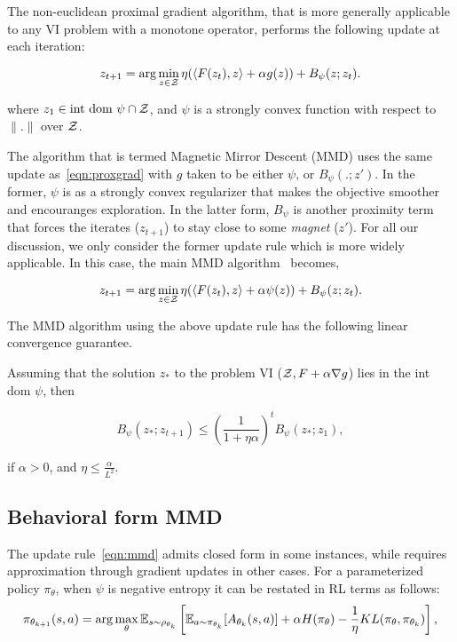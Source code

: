 The non-euclidean proximal gradient algorithm, that is more generally applicable to any VI problem
with a monotone operator, performs the following update at each iteration:

\begin{equation}
	\label{eqn:proxgrad} z_{t+1} = \arg \min_{z \in \mathcal{Z}} \eta (\langle F(z_t),
	z\rangle + \alpha g(z)) + B_{\psi} (z; z_t).
\end{equation}

where $z_1 \in \text{int dom } \psi \cap \mathcal{Z}$, and $\psi$ is a strongly convex function with respect to $\|.\|$ over $\mathcal{Z}$.

The algorithm that is termed Magnetic Mirror Descent (MMD) uses the same update
as~\ref{eqn:proxgrad} with $g$ taken to be either $\psi$, or $B_{\psi}(.
	;z')$.
In the former, $\psi$ is as a strongly convex regularizer that makes the objective smoother and
encouranges exploration.
In the latter form, $B_{\psi}$ is another proximity term that forces the iterates ($z_{t+1}$) to
stay close to some \textit{magnet} ($z'$).
For all our discussion, we only consider the former update rule which is more widely applicable.
In this case, the main MMD algorithm~\cite[(Algorithm 3.6)]{sokotaUnified2023} becomes,

\begin{equation}
	\label{eqn:mmd} z_{t+1} = \arg \min_{z \in \mathcal{Z}} \eta
	(\langle F(z_t), z\rangle + \alpha \psi(z)) + B_{\psi} (z; z_t).
\end{equation}

The MMD algorithm using the above update rule has the following linear convergence guarantee.
\begin{theorem}
	\label{thm:mmdconv}
	\cite[Theorem 3.4]{sokotaUnified2023}
	Assuming that the solution $z_{\ast}$ to the problem VI ($\mathcal{Z}, F + \alpha \nabla g$) lies in the
	int dom $\psi$, then

	\[ B_{\psi} (z_{\ast}; z_{t + 1}) \leq { \left(\frac{1}{1
				+ \eta \alpha}\right)}^t B_{\psi} (z_{\ast}; z_1), \]

	if $\alpha > 0$, and
	$\eta \leq \frac{\alpha}{L^2}$.
\end{theorem}

\subsection{Behavioral form MMD}

The update rule~\ref{eqn:mmd} admits closed form in some instances, while requires approximation
through gradient updates in other cases.
For a parameterized policy $\pi_\theta$, when $\psi$ is negative entropy it can be restated in RL
terms as follows:
\begin{equation}
	\label{eqn:mmdbf} \pi_{ \theta_{k+1}}(s,a) = \arg \max_{\theta}
	\mathbb{E}_{s \sim \rho_{\theta_k}} \left[ \mathbb{E}_{a \sim \pi_{\theta_k}} [A_{\theta_k}(s, a)] + \alpha
		H(\pi_\theta) - \frac{1}{\eta} KL(\pi_\theta, \pi_{\theta_k}) \right],
\end{equation}

